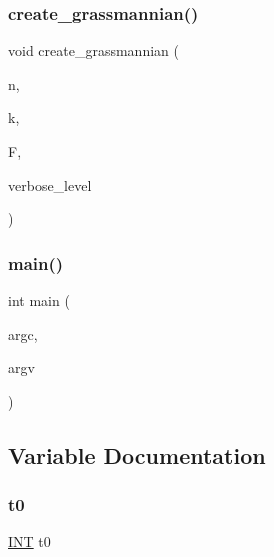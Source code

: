\subsubsection{\texorpdfstring{create\+\_\+grassmannian()}{create\_grassmannian()}}
{\footnotesize\ttfamily void create\+\_\+grassmannian (\begin{DoxyParamCaption}\item[{\mbox{\hyperlink{galois_8h_a09fddde158a3a20bd2dcadb609de11dc}{I\+NT}}}]{n,  }\item[{\mbox{\hyperlink{galois_8h_a09fddde158a3a20bd2dcadb609de11dc}{I\+NT}}}]{k,  }\item[{\mbox{\hyperlink{classfinite__field}{finite\+\_\+field}} $\ast$}]{F,  }\item[{\mbox{\hyperlink{galois_8h_a09fddde158a3a20bd2dcadb609de11dc}{I\+NT}}}]{verbose\+\_\+level }\end{DoxyParamCaption})}

\mbox{\label{make__grassmannian_8_c_a3c04138a5bfe5d72780bb7e82a18e627}} 
\subsubsection{\texorpdfstring{main()}{main()}}
{\footnotesize\ttfamily int main (\begin{DoxyParamCaption}\item[{int}]{argc,  }\item[{char $\ast$$\ast$}]{argv }\end{DoxyParamCaption})}



\subsection{Variable Documentation}
\mbox{\label{make__grassmannian_8_c_a4268f4fe222ffb119218a0199f5e1904}} 
\subsubsection{\texorpdfstring{t0}{t0}}
{\footnotesize\ttfamily \mbox{\hyperlink{galois_8h_a09fddde158a3a20bd2dcadb609de11dc}{I\+NT}} t0}


